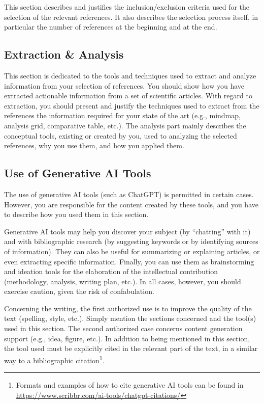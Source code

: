 This section describes and justifies the inclusion/exclusion criteria used for the selection of the relevant references. It also describes the selection process itself, in particular the number of references at the beginning and at the end.

\subsection{Extraction \& Analysis}

This section is dedicated to the tools and techniques used to extract and analyze information from your selection of references. You should show how you have extracted actionable information from a set of scientific articles.
With regard to extraction, you should present and justify the techniques used to extract from the references the information required for your state of the art (e.g., mindmap, analysis grid, comparative table, etc.).
The analysis part mainly describes the conceptual tools, existing or created by you, used to analyzing the selected references, why you use them, and how you applied them.

\subsection{Use of Generative AI Tools}

The use of generative AI tools (such as ChatGPT) is permitted in certain cases. However, you are responsible for the content created by these tools, and you have to describe how you used them in this section.

Generative AI tools may help you discover your subject (by “chatting” with it) and with bibliographic research (by suggesting keywords or by identifying sources of information). They can also be useful for summarizing or explaining articles, or even extracting specific information.
Finally, you can use them as brainstorming and ideation tools for the elaboration of the intellectual contribution (methodology, analysis, writing plan, etc.). In all cases, however, you should exercise caution, given the risk of confabulation.

Concerning the writing, the first authorized use is to improve the quality of the text (spelling, style, etc.). Simply mention the sections concerned and the tool(s) used in this section.
The second authorized case concerns content generation support (e.g., idea, figure, etc.). In addition to being mentioned in this section, the tool used must be explicitly cited in the relevant part of the text, in a similar way to a bibliographic citation\footnote{Formats and examples of how to cite generative AI tools can be found in \url{https://www.scribbr.com/ai-tools/chatgpt-citations/}}.

